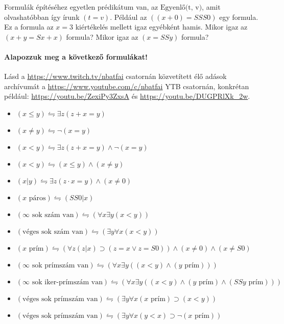 \documentclass{article}
\begin{document}
Formulák építéséhez egyetlen prédikátum van, az $\text{Egyenlő(t, v)}$, amit olvashatóbban így írunk $(t=v)$.
Például az $((x+0) = SSS0)$ egy formula. Ez a formula az $x=3$ kiértékelés mellett igaz egyébként hamis.
Mikor igaz az $(x+y = Sx+x)$ formula? Mikor igaz az $(x = SSy)$ formula?

\paragraph{Alapozzuk meg a következő formulákat!} 

Lásd a \url{https://www.twitch.tv/nbatfai} csatornán közvetített élő adások archívumát a \url{https://www.youtube.com/c/nbatfai} YTB csatornán, konkrétan például: \url{https://youtu.be/ZexiPy3ZxsA} és \url{https://youtu.be/DUGPRlXk_2w}.

\begin{itemize}
\item
$ (x \le y) \leftrightharpoons \exists z(z+x=y)$ 

\item
$ (x \neq y) \leftrightharpoons  \neg (x=y)$ 

\item
$ (x < y) \leftrightharpoons \exists z(z+x=y) \wedge \neg (x=y)$ 

\item
$ (x < y) \leftrightharpoons  (x \le y )\wedge ( x \neq y)$ 

\item
$(x \vert y) \leftrightharpoons \exists z ( z \cdot x=y )\wedge ( x \neq 0)$ 

\item
$(x \text{ páros}) \leftrightharpoons (SS0 \vert x)$ 

\item
$(\infty \text{ sok szám van}) \leftrightharpoons (\forall x \exists y (x<y))$ 

\item
$(\text{véges sok szám van}) \leftrightharpoons ( \exists y \forall x (x<y))$ 

\item
$(x \text{ prím}) \leftrightharpoons  (\forall z( z \vert x )\supset ( z = x \vee z=S0))\wedge ( x \neq 0)\wedge ( x \neq S0)$ 

\item
$(\infty \text{ sok prímszám van}) \leftrightharpoons (\forall x \exists y ((x<y)\wedge(y \text{ prím}))) $ 

\item
$(\infty \text{ sok iker-prímszám van}) \leftrightharpoons   (\forall x \exists y ((x<y)\wedge(y \text{ prím})\wedge(SSy \text{ prím})))$ 

\item
$ (\text{véges sok prímszám van}) \leftrightharpoons   ( \exists y \forall x (x \text{ prím}) \supset (x<y)) $ 

\item
$ (\text{véges sok prímszám van}) \leftrightharpoons   ( \exists y \forall x (y<x) \supset \neg (x \text{ prím})) $ 

 \end{itemize}
\end{document}
